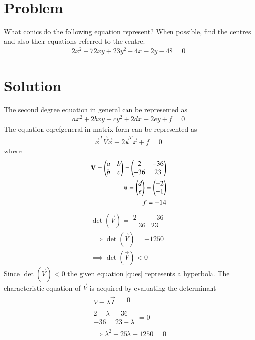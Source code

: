 \documentclass[journal,12pt,twocolumn]{IEEEtran}
\begin{document}
\section{Problem}

What conics do the following equation represent? When possible, find the centres and also their equations referred to the centre.
\begin{align}
2x^2-72xy+23y^2-4x-2y-48=0\label{ques}
\end{align}
\section{Solution }
The second degree equation in general can be represented as
\begin{align}\label{general}
    ax^2+2bxy+cy^2+2dx+2ey+f=0
\end{align}
The equation eqref{general} in matrix form can be represented as 
\begin{align}
\vec{x}^T\vec{V}\vec{x}+2\vec{u}^T\vec{x}+f=0\label{given}
\end{align}
where 
\begin{align}
\mathbf{V}=\begin{pmatrix}a&b\\b&c\end{pmatrix}=\begin{pmatrix}2 & -36\\-36 & 23\end{pmatrix}\\
\mathbf{u}=\begin{pmatrix}d\\e\end{pmatrix}=\begin{pmatrix}-2 \\ -1\end{pmatrix}\\
f=-14
\end{align}
\begin{align}
    \det(\vec{V})=\begin{array}{|cc|} 2 & -36\\-36 & 23 \end{array}\\
\implies\det(\vec{V})=-1250\\
\implies\det(\vec{V})<0
\end{align}
Since $\det(\vec{V})<0$ the given equation \eqref{ques} represents a hyperbola. The characteristic equation of $\vec{V}$ is acquired by evaluating the determinant 
\begin{align}
       \begin{array}{|c|}
V-\lambda\vec{I}
\end{array}=0\\
   \begin{array}{|cc|}
2-\lambda & -36 \\ -36 & 23-\lambda
\end{array}=0\\
\implies \lambda^2-25\lambda-1250=0\label{eqroots}
\end{align}
\end{document}
